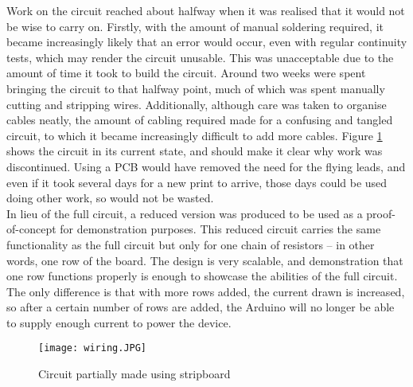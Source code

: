 Work on the circuit reached about halfway when it was realised that it would not be wise to carry on. Firstly, with the amount of manual soldering required, it became increasingly likely that an error would occur, even with regular continuity tests, which may render the circuit unusable. This was unacceptable due to the amount of time it took to build the circuit. Around two weeks were spent bringing the circuit to that halfway point, much of which was spent manually cutting and stripping wires. Additionally, although care was taken to organise cables neatly, the amount of cabling required made for a confusing and tangled circuit, to which it became increasingly difficult to add more cables. Figure \ref{fig:wiring} shows the circuit in its current state, and should make it clear why work was discontinued. Using a PCB would have removed the need for the flying leads, and even if it took several days for a new print to arrive, those days could be used doing other work, so would not be wasted.\\

In lieu of the full circuit, a reduced version was produced to be used as a proof-of-concept for demonstration purposes. This reduced circuit carries the same functionality as the full circuit but only for one chain of resistors -- in other words, one row of the board. The design is very scalable, and demonstration that one row functions properly is enough to showcase the abilities of the full circuit. The only difference is that with more rows added, the current drawn is increased, so after a certain number of rows are added, the Arduino will no longer be able to supply enough current to power the device.


\begin{figure}[H]
	\begin{center}
	\texttt{[image: wiring.JPG]}\\ 
  	\caption{Circuit partially made using stripboard}
    \label{fig:wiring}
    \end{center}
\end{figure}




